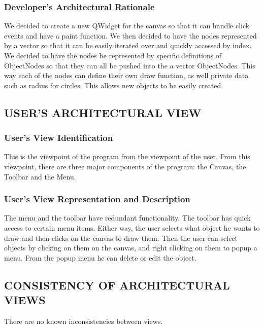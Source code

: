 \documentclass[twoside,letterpaper]{article}
\begin{document}
{\subsubsection{Developer{\textquoteright}s Architectural Rationale}

{\color{black}
We decided to create a new QWidget for the canvas so that it can handle
click events and have a paint function. We then decided to have the nodes
represented by a vector so that it can be easily iterated over and quickly
accessed by index. We decided to have the nodes be represented by specific
definitions of ObjectNodes so that they can all be pushed into the a vector
ObjectNodes. This way each of the nodes can define their own draw function,
as well private data such as radius for circles. This allows new objects to
be easily created. }


\subsection[USER{\textquoteright}S ARCHITECTURAL
VIEW]{\bfseries\color{black}
USER{\textquoteright}S ARCHITECTURAL VIEW}

\subsubsection{User{\textquoteright}s View Identification}

{\color{black}
This is the viewpoint of the program from the viewpoint of the user.
From this viewpoint, there are three major components of the
program: the Canvas, the Toolbar and the Menu. }

\subsubsection{User{\textquoteright}s View Representation and
Description }
{\color{black}
The menu and the toolbar have redundant functionality. The toolbar has
quick access to certain menu items. Either way, the user selects what object
he wants to draw and then clicks on the canvas to draw them. Then the user
can select objects by clicking on them on the canvas, and right clicking
on them to popup a menu. From the popup menu he can delete or edit the object.}

\subsection[CONSISTENCY OF ARCHITECTURAL
VIEWS]{\bfseries\color{black} CONSISTENCY OF
ARCHITECTURAL VIEWS}
{\color{black}
There are no known inconsistencies between views. }

}
\end{document}
